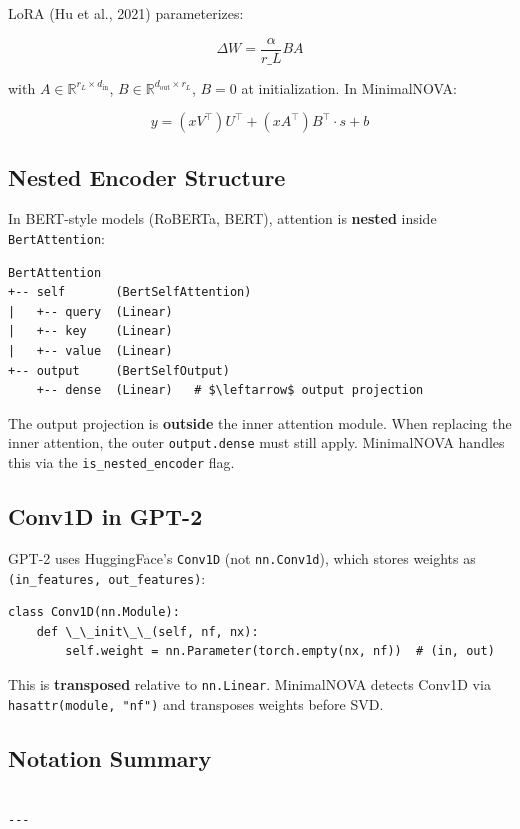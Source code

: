 LoRA (Hu et al., 2021) parameterizes:

\[
\Delta W = \frac{\alpha}{r\_L} B A
\tag{3.10}
\]

with $A \in \mathbb{R}^{r_L \times d_\text{in}}$, $B \in \mathbb{R}^{d_\text{out} \times r_L}$, 
$B = 0$ at initialization. In MinimalNOVA:

\[
y = (x V^\top) U^\top + (x A^\top) B^\top \cdot s + b
\tag{3.11}
\]

\subsection{Nested Encoder Structure}

In BERT-style models (RoBERTa, BERT), attention is \textbf{nested} inside 
\texttt{BertAttention}:

\begin{lstlisting}
BertAttention
+-- self       (BertSelfAttention)
|   +-- query  (Linear)
|   +-- key    (Linear)
|   +-- value  (Linear)
+-- output     (BertSelfOutput)
    +-- dense  (Linear)   # $\leftarrow$ output projection
\end{lstlisting}

The output projection is \textbf{outside} the inner attention module. When 
replacing the inner attention, the outer \texttt{output.dense} must still apply. 
MinimalNOVA handles this via the \texttt{is\_nested\_encoder} flag.

\subsection{Conv1D in GPT-2}

GPT-2 uses HuggingFace's \texttt{Conv1D} (not \texttt{nn.Conv1d}), which stores weights 
as \texttt{(in\_features, out\_features)}:

\begin{lstlisting}
class Conv1D(nn.Module):
    def \_\_init\_\_(self, nf, nx):
        self.weight = nn.Parameter(torch.empty(nx, nf))  # (in, out)
\end{lstlisting}

This is \textbf{transposed} relative to \texttt{nn.Linear}. MinimalNOVA detects Conv1D 
via \texttt{hasattr(module, "nf")} and transposes weights before SVD.

\subsection{Notation Summary}

\begin{lstlisting}

---
\end{lstlisting}